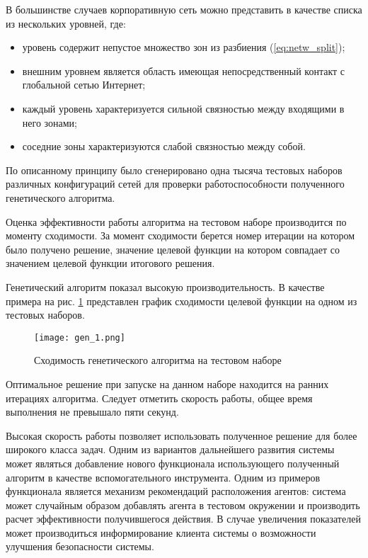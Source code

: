 В большинстве случаев корпоративную сеть можно представить в качестве списка из нескольких уровней, где:
\begin{itemize}
	\item уровень содержит непустое множество зон из разбиения (\ref{eq:netw_split});
	\item внешним уровнем является область имеющая непосредственный контакт с глобальной сетью Интернет;
	\item каждый уровень характеризуется сильной связностью между входящими в него зонами;
	\item соседние зоны характеризуются слабой связностью между собой. 
\end{itemize}

По описанному принципу было сгенерировано  одна тысяча тестовых наборов различных конфигураций сетей для проверки работоспособности полученного генетического алгоритма. 

Оценка эффективности работы алгоритма на тестовом наборе производится по моменту сходимости. За момент сходимости берется номер итерации на котором было получено решение, значение целевой функции на котором совпадает со значением целевой функции итогового решения.

Генетический алгоритм показал высокую производительность. В качестве примера на рис. \ref{fig:gen_1} представлен график сходимости целевой функции на одном из тестовых наборов.

\begin{figure}[ht]
\centering
	\texttt{[image: gen\_1.png]}  
	\caption{Сходимость генетического алгоритма на тестовом наборе}
	\label{fig:gen_1}
\end{figure}

Оптимальное решение при запуске на данном наборе находится на ранних итерациях алгоритма. Следует отметить скорость работы, общее время выполнения не превышало пяти секунд. 

Высокая скорость работы позволяет использовать полученное решение для более широкого класса задач. Одним из вариантов дальнейшего развития системы может являться добавление нового функционала использующего полученный алгоритм в качестве вспомогательного инструмента. Одним из примеров функционала является механизм рекомендаций расположения агентов: система может случайным образом добавлять агента в тестовом окружении и производить расчет эффективности получившегося действия. В случае увеличения показателей может производиться информирование клиента системы о возможности улучшения безопасности системы.

